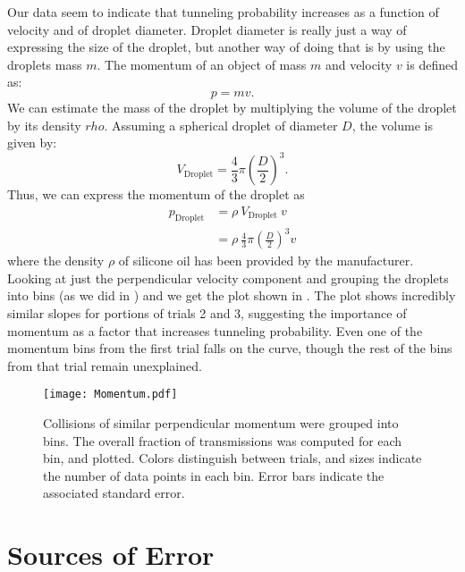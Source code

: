 Our data seem to indicate that tunneling probability increases as a function of velocity and of droplet diameter. Droplet diameter is really just a way of expressing the size of the droplet, but another way of doing that is by using the droplets mass $m$. The momentum of an object of mass $m$ and velocity $v$ is defined as:
$$p = mv.$$
We can estimate the mass of the droplet by multiplying the volume of the droplet by its density $rho$. Assuming a spherical droplet of diameter $D$, the volume is given by:
$$V_\mathrm{Droplet} = \frac{4}{3}\pi \left(\frac{D}{2}\right)^3.$$
Thus, we can express the momentum of the droplet as
\begin{align}
p_\mathrm{Droplet} &= \rho~V_\mathrm{Droplet}~v \\
& = \rho~\frac{4}{3}\pi \left(\frac{D}{2}\right)^3 v
\end{align}
where the density $\rho$ of silicone oil has been provided by the manufacturer. Looking at just the perpendicular velocity component and grouping the droplets into bins (as we did in ) and we get the plot shown in . The plot shows incredibly similar slopes for portions of trials 2 and 3, suggesting the importance of momentum as a factor that increases tunneling probability. Even one of the momentum bins from the first trial falls on the curve, though the rest of the bins from that trial remain unexplained. 

\begin{figure}[h!]
	\centering
	\texttt{[image: Momentum.pdf]}
	\caption{Collisions of similar perpendicular momentum were grouped into bins. The overall fraction of transmissions was computed for each bin, and plotted. Colors distinguish between trials, and sizes indicate the number of data points in each bin. Error bars indicate the associated standard error. }
	\label{fig:mom}
\end{figure}




\section{Sources of Error}
\label{sect:error}

